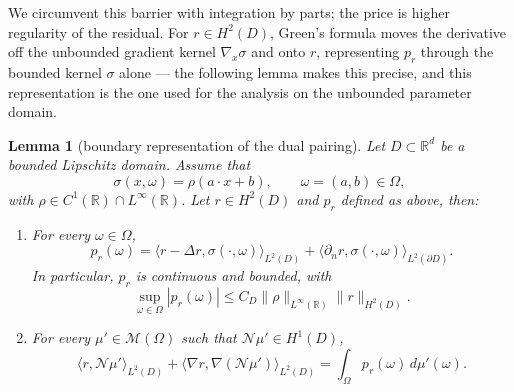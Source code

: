\documentclass[11pt]{amsart}
\newtheorem{lemma}[theorem]{Lemma}
\theoremstyle{definition}
\theoremstyle{remark}
\begin{document}
We circumvent this barrier with integration by parts; the price is higher
regularity of the residual. For $r \in H^2(D)$, Green's formula moves the
derivative off the unbounded gradient kernel $\nabla_x\sigma$ and onto $r$,
representing $p_r$ through the bounded kernel $\sigma$ alone --- the following
lemma makes this precise, and this representation is the one used for the
analysis on the unbounded parameter domain.

\begin{lemma}[boundary representation of the dual pairing]\label{lem:dual_pairing}
Let $D \subset \mathbb{R}^d$ be a bounded Lipschitz domain. Assume that
\[
\sigma(x,\omega) = \rho(a\cdot x+b), \qquad \omega=(a,b)\in\Omega,
\]
with $\rho \in C^1(\mathbb{R}) \cap L^\infty(\mathbb{R})$. Let
$r \in H^2(D)$ and $p_r$ defined as above, then:
\begin{enumerate}
\item For every $\omega\in\Omega$,
\begin{equation*}
	p_r(\omega)
	= \langle r-\Delta r, \sigma(\cdot,\omega)\rangle_{L^2(D)}
	+ \langle \partial_n r, \sigma(\cdot,\omega)\rangle_{L^2(\partial D)}.
\end{equation*}
In particular, $p_r$ is continuous and bounded, with
\begin{equation*}
	\sup_{\omega\in\Omega} |p_r(\omega)|
	\le C_D \|\rho\|_{L^\infty(\mathbb{R})}\|r\|_{H^2(D)}.
\end{equation*}

\item For every $\mu' \in \mathcal{M}(\Omega)$ such that
$\mathcal{N}\mu' \in H^1(D)$,
\begin{equation*}
	\langle r, \mathcal{N}\mu' \rangle_{L^2(D)}
	+ \langle \nabla r, \nabla(\mathcal{N}\mu') \rangle_{L^2(D)}
	= \int_\Omega p_r(\omega)\,d\mu'(\omega).
\end{equation*}
\end{enumerate}
\end{lemma}
\end{document}
